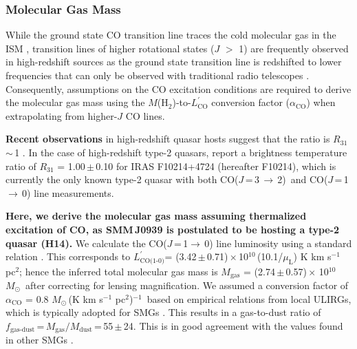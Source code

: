 \documentclass[iop, revtex4]{emulateapj}
\newcommand{\Msun}{\mbox{$M_{\odot}$}}
\newcommand{\rarr}{$\rightarrow$}
\newcommand{\CO}{\mbox{CO($J$\,=\,3\,$\rightarrow$\,2) }}
\newcommand{\Lp}{\mbox{$L^{\prime}_\textrm{CO(1-0)}$}}
\newcommand{\LpU}{\mbox{K\,\,km\,\,s$^{-1}$\,\,pc$^2$}}
\newcommand{\eg}{{\sl e.g.,~}}
\newcommand{\pmOne}{\mbox{$^{-1}$}}
\begin{document}
\subsubsection{Molecular Gas Mass} \label{sec:gas}
While the ground state CO transition line traces the cold molecular gas in the ISM
\citep*[\eg][]{Wilson70a,Downes98a}, transition lines of higher rotational states ($J$ $>$ 1) are frequently observed in high-redshift sources as the
 ground state transition line is redshifted to lower frequencies that can only be observed with traditional radio telescopes
 \citep{Carilli13a}. Consequently, assumptions on the CO excitation conditions are required to derive the molecular gas mass using the $M$(H$_\textrm{2}$)-to-$L^{\prime}_\textrm{CO}$
 conversion factor ($\alpha_\mathrm{CO}$) when extrapolating from higher-$J$ CO lines. \par
{\bf Recent observations} in high-redshift quasar hosts suggest that the ratio
   is $R_\textrm{31}$\,$\sim$\,1 \citep{Riechers06a, Riechers11a}. In the case of high-redshift type-2 quasars, \citet{Riechers11a} report a brightness temperature ratio of $R_\textrm{31}$ = 1.00\,$\pm$\,0.10 for IRAS F10214+4724 (hereafter F10214), which is currently the only known type-2 quasar with both \CO and CO($J$\,=\,1\,\rarr\,0) line measurements. \par
{\bf Here, we derive the molecular gas mass
assuming thermalized excitation of CO, as SMM\,J0939 is
postulated to be hosting a type-2 quasar (H14).}
We calculate the CO($J$\,=\,1\rarr\,0) line luminosity using a standard relation
\citep[\eg][]{Solomon05a}. This corresponds to \Lp = (3.42\,$\pm$\,0.71)\,$\times$\,10$^{10}$\,(10.1/$\mu_\textrm{L}$) \LpU; hence the inferred total molecular gas mass is $M_\textrm{gas}$ = (2.74\,$\pm$\,0.57)\,$\times$\,\,10$^{10}$\,\Msun\, after correcting for lensing magnification. We assumed a conversion factor of $\alpha_\textrm{CO}$ = 0.8\,\,\Msun\,(\LpU)\pmOne\ based on empirical relations from local ULIRGs, which is typically
adopted for SMGs \citep[\eg][]{Tacconi06a,Tacconi08a,Bothwell13a}.
This results in a gas-to-dust
ratio of $f_\textrm{gas-dust}$\,=\,$M_\textrm{gas}/M_\textrm{dust}$\,=\,55\,$\pm$\,24. 
This is in good agreement  with the
values found in other SMGs \citep{Coppin08a,Micha10a,Riechers11c}.
\end{document}
